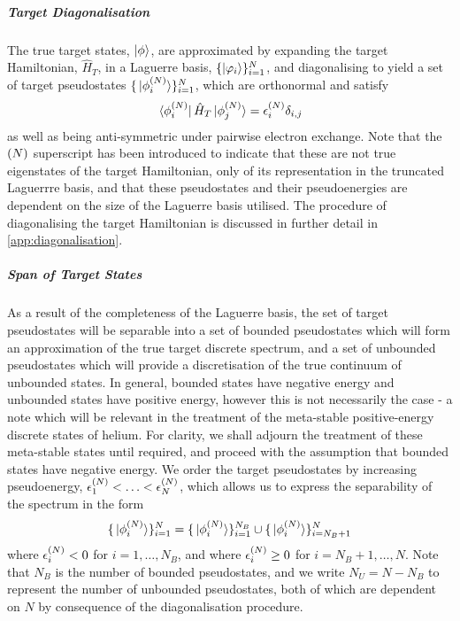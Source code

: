 \documentclass[draft]{article}
\begin{document}
\subparagraph{Target Diagonalisation}
\label{sec:target-diagonalisation}

The true target states, $\ket{\phi}$, are approximated by expanding the target
Hamiltonian, $\hat{H}_{T}$, in a Laguerre basis,
$\lbrace\ket{\varphi_{i}}\rbrace_{i = 1}^{N}$, and diagonalising to yield a set of
target pseudostates $\lbrace\ket*{\phi_{i}^{(N)}}\rbrace_{i = 1}^{N}$, which are
orthonormal and satisfy
\begin{equation}
  \label{eq:target-states}
  \bra*{\phi_{i}^{(N)}}
  \hat{H}_{T}
  \ket*{\phi_{j}^{(N)}}
  =
  \epsilon_{i}^{(N)}
  \delta_{i, j}
\end{equation}
as well as being anti-symmetric under pairwise electron exchange.
Note that the $(N)$ superscript has been introduced to indicate that these
are not true eigenstates of the target Hamiltonian, only of its representation
in the truncated Laguerrre basis, and that these pseudostates and their
pseudoenergies are dependent on the size of the Laguerre basis utilised.
The procedure of diagonalising the target Hamiltonian is discussed in further
detail in \autoref{app:diagonalisation}.

\subparagraph{Span of Target States}
\label{sec:target-states-span}

As a result of the completeness of the Laguerre basis, the set of target
pseudostates will be separable into a set of bounded pseudostates which will
form an approximation of the true target discrete spectrum, and a set of
unbounded pseudostates which will provide a discretisation of the true continuum
of unbounded states.
In general, bounded states have negative energy and unbounded states have
positive energy, however this is not necessarily the case - a note which will be
relevant in the treatment of the meta-stable positive-energy discrete states of
helium.
For clarity, we shall adjourn the treatment of these meta-stable states until
required, and proceed with the assumption that bounded states have negative
energy.
We order the target pseudostates by increasing pseudoenergy,
$\epsilon_{1}^{(N)} < \dotsc < \epsilon_{N}^{(N)}$, which allows us to
express the separability of the spectrum in the form
\begin{equation}
  \label{eq:target-spectrum-separable}
  \lbrace\ket*{\phi_{i}^{(N)}}\rbrace_{i = 1}^{N}
  =
  \lbrace\ket*{\phi_{i}^{(N)}}\rbrace_{i = 1}^{N_{B}}
  \cup
  \lbrace\ket*{\phi_{i}^{(N)}}\rbrace_{i = N_{B} + 1}^{N}
\end{equation}
where $\epsilon_{i}^{(N)} < 0$ for $i = 1, \dotsc, N_{B}$, and where
$\epsilon_{i}^{(N)} \geq 0$ for $i = N_{B} + 1, \dotsc, N$.
Note that $N_{B}$ is the number of bounded pseudostates, and we write
$N_{U} = N - N_{B}$ to represent the number of unbounded pseudostates, both of
which are dependent on $N$ by consequence of the diagonalisation procedure.
\end{document}
